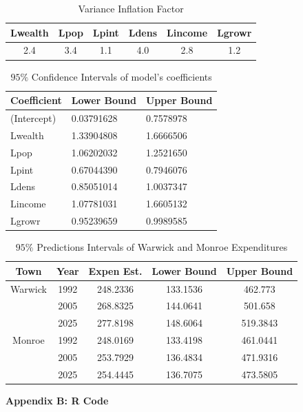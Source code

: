 \documentclass{article}\usepackage[]{graphicx}\usepackage[]{color}
\begin{document}
%
\begin{table}[h!]
  \begin{center}
    \caption{Variance Inflation Factor}
    \label{vif}
    \begin{tabular}{c | c | c | c | c | c} \hline
      \textbf{Lwealth} & \textbf{Lpop} & \textbf{Lpint} & \textbf{Ldens} & \textbf{Lincome}& \textbf{Lgrowr}\\
      \hline
     2.4 & 3.4 & 1.1 & 4.0 & 2.8 & 1.2 \\
    \end{tabular}
    \end{center}
\end{table}
%
\begin{table}[h!]
  \begin{center}
    \caption{$95 \%$ Confidence Intervals of model's coefficients}
       \begin{tabular}{l|l|l} 
      \textbf{Coefficient} & \textbf{Lower Bound} & \textbf{Upper Bound}\\
      \hline
      (Intercept) & 0.03791628 & 0.7578978 \\
Lwealth     & 1.33904808 & 1.6666506 \\
Lpop        & 1.06202032 & 1.2521650 \\
Lpint       & 0.67044390 & 0.7946076 \\
Ldens       & 0.85051014 & 1.0037347 \\
Lincome     & 1.07781031 & 1.6605132 \\
Lgrowr      & 0.95239659 & 0.9989585 \\
      
    \end{tabular}
  \end{center}
\end{table}
                
\begin{table}[h!]
  \begin{center}
    \caption{$95 \%$ Predictions Intervals of Warwick and Monroe Expenditures}
    
    \begin{tabular}{c | c | c | c | c} \hline
      \textbf{Town} & \textbf{Year} & \textbf{Expen Est.} & \textbf{Lower Bound} & \textbf{Upper Bound}\\
      \hline
     Warwick & 1992 & 248.2336 & 133.1536 & 462.773 \\
             & 2005 & 268.8325 & 144.0641 & 501.658 \\
             & 2025 & 277.8198 & 148.6064 & 519.3843 \\
                  \hline
	Monroe & 1992 & 248.0169 & 133.4198 & 461.0441 \\
		     & 2005 & 253.7929 & 136.4834 & 471.9316 \\
		     & 2025 & 254.4445 & 136.7075 & 473.5805 \\
      
    \end{tabular}
  \end{center}
\end{table}


\newpage
\noindent \Large{{\bf Appendix B: R Code}}

\end{document}
